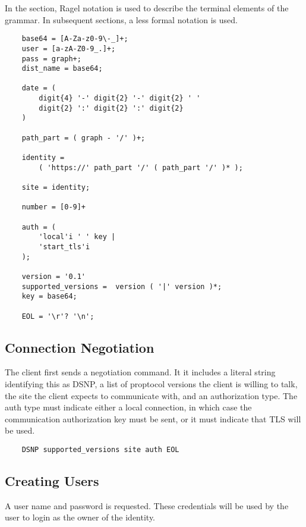 \documentclass[letterpaper,11pt,oneside]{article}
\begin{document}
In the section, Ragel notation is used to describe the terminal elements of the
grammar. In subsequent sections, a less formal notation is used.

\vspace{10pt}
\begin{verbatim}
    base64 = [A-Za-z0-9\-_]+;
    user = [a-zA-Z0-9_.]+;
    pass = graph+;
    dist_name = base64;

    date = (
        digit{4} '-' digit{2} '-' digit{2} ' ' 
        digit{2} ':' digit{2} ':' digit{2} 
    )

    path_part = ( graph - '/' )+;

    identity = 
        ( 'https://' path_part '/' ( path_part '/' )* );

    site = identity;

    number = [0-9]+           

    auth = ( 
        'local'i ' ' key |
        'start_tls'i
    );

    version = '0.1'
    supported_versions =  version ( '|' version )*;
    key = base64;

    EOL = '\r'? '\n';
\end{verbatim}

\subsection{Connection Negotiation}

The client first sends a negotiation command. It it includes a literal string
identifying this as DSNP, a list of proptocol versions the client is willing to
talk, the site the client expects to communicate with, and an authorization
type. The auth type must indicate either a local connection, in which case the
communication authorization key must be sent, or it must indicate that TLS will
be used.

\vspace{10pt}
\begin{verbatim}
    DSNP supported_versions site auth EOL
\end{verbatim}

\subsection{Creating Users}

\vspace{10pt}
A user name and password is requested. These credentials will be used by the
user to login as the owner of the identity.
\end{document}
